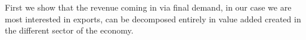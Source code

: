 \documentclass[12pt,english]{article}
\begin{document}


First we show that the revenue coming in via final demand, in our case we are most interested in exports, can be decomposed entirely in value added created in the different sector of the economy.
\end{document}
